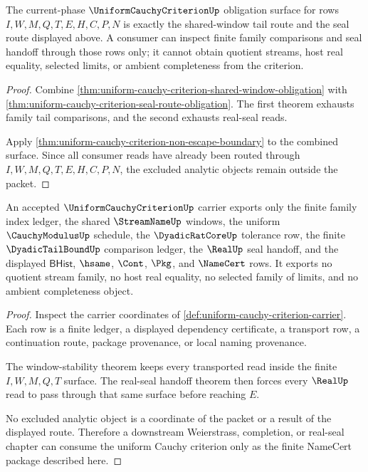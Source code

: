 \begin{theorem}
\label{thm:uniform-cauchy-criterion-nonescape-obligation}
The current-phase $\UniformCauchyCriterionUp$ obligation surface for rows $I,W,M,Q,T,E,H,C,P,N$ is exactly the shared-window tail route and the seal route displayed above. A consumer can inspect finite family comparisons and seal handoff through those rows only; it cannot obtain quotient streams, host real equality, selected limits, or ambient completeness from the criterion.
\end{theorem}
\begin{proof}
Combine \autoref{thm:uniform-cauchy-criterion-shared-window-obligation} with \autoref{thm:uniform-cauchy-criterion-seal-route-obligation}. The first theorem exhausts family tail comparisons, and the second exhausts real-seal reads.

Apply \autoref{thm:uniform-cauchy-criterion-non-escape-boundary} to the combined surface. Since all consumer reads have already been routed through $I,W,M,Q,T,E,H,C,P,N$, the excluded analytic objects remain outside the packet.
\end{proof}

\begin{theorem}
\label{thm:uniform-cauchy-criterion-non-escape-boundary}
An accepted $\UniformCauchyCriterionUp$ carrier exports only the finite family index ledger, the shared $\StreamNameUp$ windows, the uniform $\CauchyModulusUp$ schedule, the $\DyadicRatCoreUp$ tolerance row, the finite $\DyadicTailBoundUp$ comparison ledger, the $\RealUp$ seal handoff, and the displayed $\mathsf{BHist}$, $\hsame$, $\Cont$, $\Pkg$, and $\NameCert$ rows. It exports no quotient stream family, no host real equality, no selected family of limits, and no ambient completeness object.
\end{theorem}
\begin{proof}
Inspect the carrier coordinates of \autoref{def:uniform-cauchy-criterion-carrier}. Each row is a finite ledger, a displayed dependency certificate, a transport row, a continuation route, package provenance, or local naming provenance.

The window-stability theorem keeps every transported read inside the finite $I,W,M,Q,T$ surface. The real-seal handoff theorem then forces every $\RealUp$ read to pass through that same surface before reaching $E$.

No excluded analytic object is a coordinate of the packet or a result of the displayed route. Therefore a downstream Weierstrass, completion, or real-seal chapter can consume the uniform Cauchy criterion only as the finite NameCert package described here.
\end{proof}

